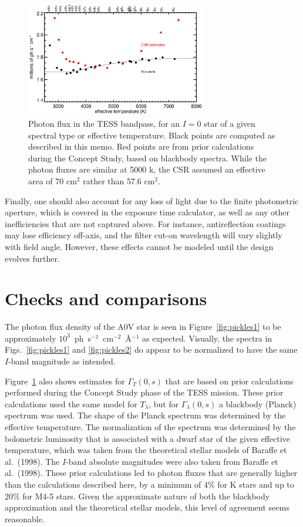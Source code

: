 \documentclass[preprint,10pt]{aastex}
\begin{document}
\begin{figure}
\begin{center}
\includegraphics[width=0.7\textwidth]{ph_versus_teff.eps}
\end{center}
\caption{Photon flux in the TESS bandpass, for an $I=0$ star of
a given spectral type or effective temperature.
Black points are computed as described in this memo.
Red points are from prior calculations during the Concept Study,
based on blackbody spectra. While the photon fluxes are similar at 5000 k,
the CSR assumed an effective area of 70 cm$^2$ rather than 57.6 cm$^2$.}
\label{fig:ph_versus_teff}
\end{figure}

Finally, one should also
account for any loss of light due to the finite photometric aperture, which is covered in the exposure time calculator, 
as well as any other inefficiencies that are not captured above. For instance, antireflection coatings may lose efficiency off-axis, and the filter cut-on wavelength will vary slightly with field angle. However, these effects cannot be modeled until the design evolves further.

\section{Checks and comparisons}

The photon flux density of the A0V star is seen in
Figure~\ref{fig:pickles1} to be approximately
$10^3$~ph~s$^{-1}$~cm$^{-2}$~\AA$^{-1}$ as expected.  Visually, the
spectra in Figs.~\ref{fig:pickles1} and \ref{fig:pickles2} do appear
to be normalized to have the same $I$-band magnitude as intended.

Figure~\ref{fig:ph_versus_teff} also shows estimates for $\Gamma_T(0,s)$ that are based on prior calculations performed during the Concept Study phase of the TESS mission. These prior calculations used the same model for $T_\lambda$, but
for $\Gamma_\lambda(0,s)$ a blackbody (Planck) spectrum was used.  The shape of the Planck spectrum was determined by the effective temperature.  The normalization of the spectrum was determined by the bolometric luminosity that is associated with a dwarf star of the given effective temperature, which was taken from the theoretical stellar models of Baraffe et al.~(1998).  The $I$-band absolute magnitudes were also taken from Baraffe et al.~(1998).  These prior calculations led to photon fluxes that are generally higher than the calculations described here, by a minimum of 4\% for K stars and up to 20\% for M4-5 stars.  Given the approximate nature of both the blackbody approximation and the theoretical stellar models, this level of agreement seems reasonable.
\end{document}
